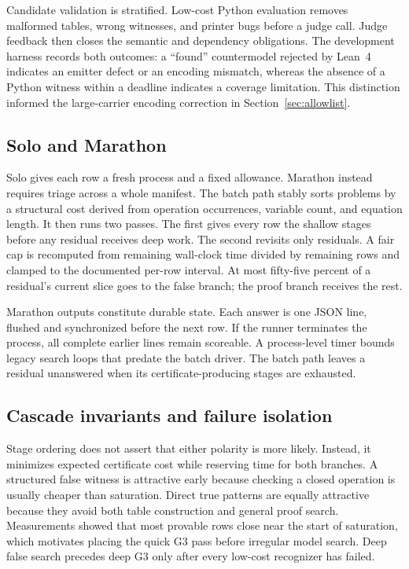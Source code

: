 \documentclass[10pt,twocolumn]{article}
\newcommand{\lean}{Lean~4\xspace}
\begin{document}
Candidate validation is stratified.  Low-cost Python evaluation removes
malformed tables, wrong witnesses, and printer bugs before a judge call.  Judge feedback
then closes the semantic and dependency obligations.  The development harness
records both outcomes: a ``found'' countermodel rejected by \lean indicates an
emitter defect or an encoding mismatch, whereas the absence of a Python
witness within a deadline indicates a coverage limitation.  This distinction informed the large-carrier encoding correction in
Section~\ref{sec:allowlist}.

\subsection{Solo and Marathon}

Solo gives each row a fresh process and a fixed allowance.  Marathon instead
requires triage across a whole manifest.  The batch path stably sorts problems
by a structural cost derived from operation occurrences, variable count, and
equation length.  It then runs two passes.  The first gives every row the
shallow stages before any residual receives deep work.  The second revisits
only residuals.  A fair cap is recomputed from remaining wall-clock time
divided by remaining rows and clamped to the documented per-row interval.  At most fifty-five
percent of a residual's current slice goes to the false branch; the proof
branch receives the rest.

Marathon outputs constitute durable state.  Each answer is one JSON line, flushed and
synchronized before the next row.  If the runner terminates the process, all
complete earlier lines remain scoreable.  A process-level timer bounds legacy
search loops that predate the batch driver.  The batch path leaves a residual
unanswered when its certificate-producing stages are exhausted.

\subsection{Cascade invariants and failure isolation}

Stage ordering does not assert that either polarity is more likely.  Instead,
it minimizes expected certificate cost while reserving time for both
branches.  A structured false witness is attractive early because checking a
closed operation is usually cheaper than saturation.  Direct true patterns are
equally attractive because they avoid both table construction and general proof
search.  Measurements showed that most provable rows close near the start of
saturation, which motivates placing the quick G3 pass before irregular model
search.  Deep false search precedes deep G3 only after every low-cost recognizer
has failed.
\end{document}
